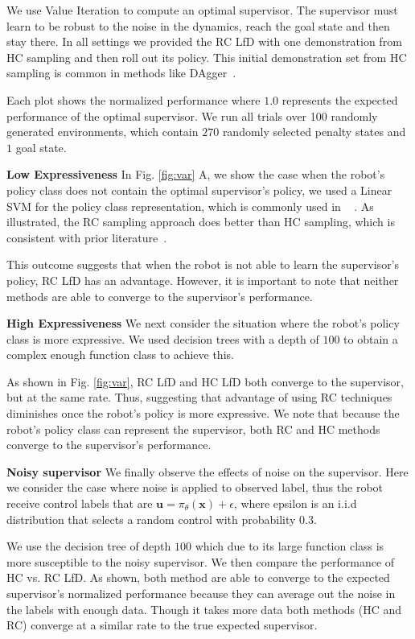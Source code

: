 \documentclass[10pt, conference]{ieeeconf}      %
\newcommand{\bu}{\mathbf{u}}
\newcommand{\bx}{\mathbf{x}}
\begin{document}
We use Value Iteration to compute an optimal supervisor. The supervisor must learn to be robust to the noise in the dynamics, reach the goal state and then stay there. In all settings we provided the RC LfD with one demonstration from HC sampling and then roll out its policy. This initial demonstration set from HC sampling is common in methods like DAgger~\cite{rossreduction2010}.

Each plot shows the normalized performance where $1.0$ represents the expected performance of the optimal supervisor. We run all trials over 100 randomly generated environments, which contain $270$ randomly selected penalty states and $1$ goal state. 


\noindent \textbf{Low Expressiveness} In Fig. \ref{fig:var} A, we show the case when the robot's policy class does not contain the optimal supervisor's policy, we used a Linear SVM for the policy class representation, which is commonly used in ~\cite{ross2010efficient,ross2010reduction,ross2013learning} . As illustrated, the RC sampling approach does better than HC sampling, which is consistent with prior literature~\cite{ross2010efficient,ross2010reduction}.

This outcome suggests that when the robot is not able to learn the supervisor's policy, RC LfD has an advantage. However, it is important to note that neither methods are able to converge to the supervisor's performance. 

\noindent \textbf{High Expressiveness}
We next consider the situation where the robot's policy class is more expressive. We used decision trees with a depth of $100$ to obtain a complex enough function class to achieve this. 

As shown in Fig. \ref{fig:var}, RC LfD and HC LfD both converge to the supervisor, but at the same rate. Thus, suggesting that advantage of using RC techniques diminishes once the robot's policy is more expressive. We note that because the robot's policy class can represent the supervisor, both RC and HC methods converge to the supervisor's performance.


\noindent \textbf{Noisy supervisor}
We finally observe the effects of noise on the supervisor. Here we consider the case where noise is applied to observed label, thus the robot receive control labels that are $\bu = \pi_{\theta}(\bx) + \epsilon$,  where epsilon is an i.i.d distribution that selects a random control with probability $0.3$.

We use the  decision tree  of depth $100$ which due to its large function class is more susceptible to the noisy supervisor. We then compare the performance of HC vs. RC LfD. As shown, both method are able to converge to the expected supervisor's normalized performance because they can average out the noise in the labels with enough data. Though it  takes more data both methods (HC and RC) converge at a similar rate to the true expected supervisor. 
\end{document}
